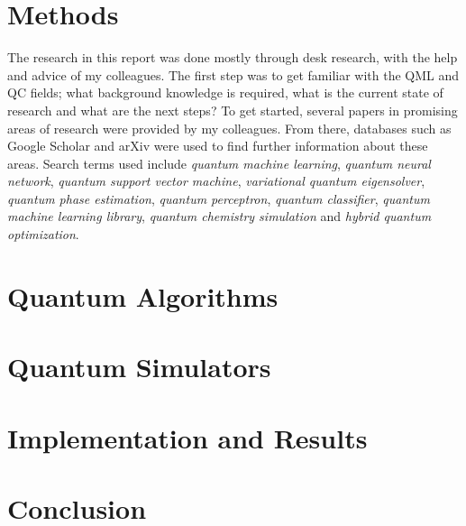 \documentclass[a4paper,11pt]{article}
\begin{document}
\section{Methods} \label{sec:methods}
The research in this report was done mostly through desk research, with the help and advice of my colleagues.
The first step was to get familiar with the QML and QC fields; what background knowledge is required, what is the current state of research and what are the next steps?
To get started, several papers in promising areas of research were provided by my colleagues. 
From there, databases such as Google Scholar and arXiv were used to find further information about these areas.
Search terms used include \emph{quantum machine learning}, \emph{quantum neural network}, \emph{quantum support vector machine}, \emph{variational quantum eigensolver}, \emph{quantum phase estimation}, \emph{quantum perceptron}, \emph{quantum classifier}, \emph{quantum machine learning library}, \emph{quantum chemistry simulation} and \emph{hybrid quantum optimization}.

\section{Quantum Algorithms} \label{sec:quantum-algorithms}

\section{Quantum Simulators} \label{sec:quantum-simulators}

\section{Implementation and Results} \label{sec:implementation-and-results}

\section{Conclusion} \label{sec:conclusion}

\printbibliography[heading=bibintoc]
\end{document}
